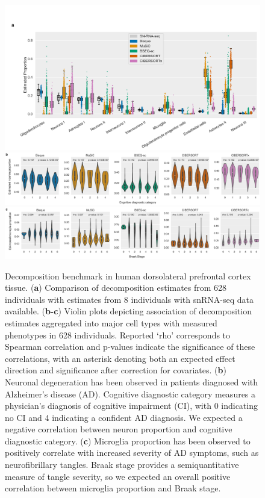 \begin{figure}
\centering
\includegraphics[scale=.24]{chapter2/figures/fig4a.pdf}
\includegraphics[width=\textwidth]{chapter2/figures/fig4b.pdf}
\includegraphics[width=\textwidth]{chapter2/figures/fig4c.pdf}
\caption{
    Decomposition benchmark in human dorsolateral prefrontal cortex tissue.
    (\textbf{a}) Comparison of decomposition estimates from 628 individuals with estimates from 8 individuals with snRNA-seq data available.
    (\textbf{b-c}) Violin plots depicting association of decomposition estimates aggregated into major cell types with measured phenotypes in 628 individuals. Reported ‘rho’ corresponds to Spearman correlation and p-values indicate the significance of these correlations, with an asterisk denoting both an expected effect direction and significance after correction for covariates.
    (\textbf{b}) Neuronal degeneration has been observed in patients diagnosed with Alzheimer’s disease (AD). Cognitive diagnostic category measures a physician’s diagnosis of cognitive impairment (CI), with 0 indicating no CI and 4 indicating a confident AD diagnosis. We expected a negative correlation between neuron proportion and cognitive diagnostic category.
    (\textbf{c}) Microglia proportion has been observed to positively correlate with increased severity of AD symptoms, such as neurofibrillary tangles. Braak stage provides a semiquantitative measure of tangle severity, so we expected an overall positive correlation between microglia proportion and Braak stage.
    }
\label{fig:fig2.4}
\end{figure}

